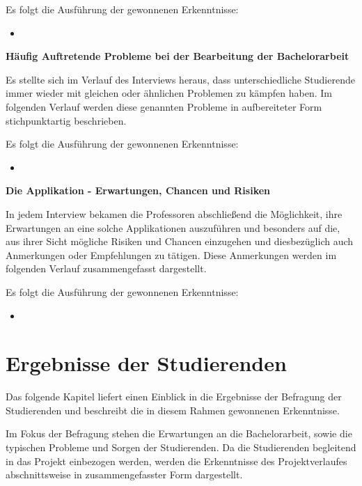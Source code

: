\documentclass{scrreprt}
\begin{document}
\par Es folgt die Ausführung der gewonnenen Erkenntnisse:
\begin{itemize}
\item 
\end{itemize}

\textbf{Häufig Auftretende Probleme bei der Bearbeitung der Bachelorarbeit}\\
\par Es stellte sich im Verlauf des Interviews heraus, dass unterschiedliche Studierende immer wieder mit gleichen oder ähnlichen Problemen zu kämpfen haben. Im folgenden Verlauf werden diese genannten Probleme in aufbereiteter Form stichpunktartig beschrieben.\\

\par Es folgt die Ausführung der gewonnenen Erkenntnisse:
\begin{itemize}
\item 
\end{itemize}

\textbf{Die Applikation - Erwartungen, Chancen und Risiken}\\
\par In jedem Interview bekamen die Professoren abschließend die Möglichkeit, ihre Erwartungen an eine solche Applikationen auszuführen und besonders auf die, aus ihrer Sicht mögliche Risiken und Chancen einzugehen und diesbezüglich auch Anmerkungen oder Empfehlungen zu tätigen. Diese Anmerkungen werden im folgenden Verlauf zusammengefasst dargestellt.\\

\par Es folgt die Ausführung der gewonnenen Erkenntnisse:
\begin{itemize}
\item 
\end{itemize}

\section{Ergebnisse der Studierenden}
\par Das folgende Kapitel liefert einen Einblick in die Ergebnisse der Befragung der Studierenden und beschreibt die in diesem Rahmen gewonnenen Erkenntnisse.
\par Im Fokus der Befragung stehen die Erwartungen an die Bachelorarbeit, sowie die typischen Probleme und Sorgen  der Studierenden. Da die Studierenden begleitend in das Projekt einbezogen werden, werden die Erkenntnisse des Projektverlaufes abschnittsweise in zusammengefasster Form dargestellt.
\end{document}

